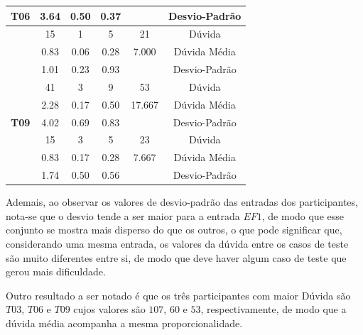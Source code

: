 \begin{table}[htbp]
\begin{tabular}{|c|c|c|c|c|c|}
		\multirow{-3}{*}{\cellcolor[HTML]{F2F2F2}\textbf{T06}} & 3.64 & 0.50 & 0.37 &  & Desvio-Padrão \\ \hline
		\rowcolor[HTML]{D9D9D9} 
		\cellcolor[HTML]{F2F2F2} & 15 & 1 & 5 & 21 & Dúvida \\ \cline{2-6} 
		\cellcolor[HTML]{F2F2F2} & 0.83 & 0.06 & 0.28 & 7.000 & Dúvida Média \\ \cline{2-6} 
		\rowcolor[HTML]{D9D9D9} 
		\multirow{-3}{*}{\cellcolor[HTML]{F2F2F2}\textbf{T08}} & 1.01 & 0.23 & 0.93 &  & Desvio-Padrão \\ \hline
		\cellcolor[HTML]{F2F2F2} & 41 & 3 & 9 & 53 & Dúvida \\ \cline{2-6} 
		\rowcolor[HTML]{D9D9D9} 
		\cellcolor[HTML]{F2F2F2} & 2.28 & 0.17 & 0.50 & 17.667 & Dúvida Média \\ \cline{2-6} 
		\multirow{-3}{*}{\cellcolor[HTML]{F2F2F2}\textbf{T09}} & 4.02 & 0.69 & 0.83 &  & Desvio-Padrão \\ \hline
		\rowcolor[HTML]{D9D9D9} 
		\cellcolor[HTML]{F2F2F2} & 15 & 3 & 5 & 23 & Dúvida \\ \cline{2-6} 
		\cellcolor[HTML]{F2F2F2} & 0.83 & 0.17 & 0.28 & 7.667 & Dúvida Média \\ \cline{2-6} 
		\rowcolor[HTML]{D9D9D9} 
		\multirow{-3}{*}{\cellcolor[HTML]{F2F2F2}\textbf{T10}} & 1.74 & 0.50 & 0.56 &  & Desvio-Padrão \\ \hline
	\end{tabular}
	\label{tab:F3_A2_D_ENTRADAS}
\end{table}

Ademais, ao observar os valores de desvio-padrão das entradas dos participantes, nota-se que o desvio tende a ser maior para a entrada $EF1$, de modo que esse conjunto se mostra mais disperso do que os outros, o que pode significar que, considerando uma mesma entrada, os valores da dúvida entre os casos de teste são muito diferentes entre si, de modo que deve haver algum caso de teste que gerou mais dificuldade.

Outro resultado a ser notado é que os três participantes com maior Dúvida são $T03$, $T06$ e $T09$ cujos valores são $107$, $60$ e $53$, respectivamente, de modo que a dúvida média acompanha a mesma proporcionalidade.

